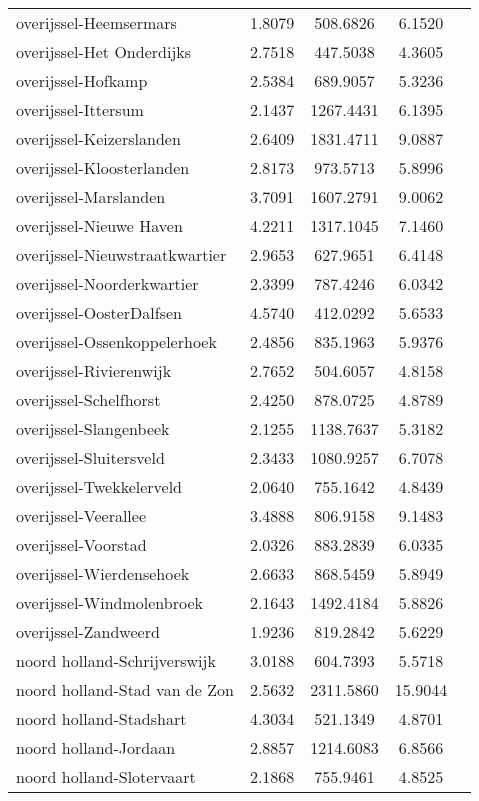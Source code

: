 \begin{longtable}{llccc}
overijssel-Heemsermars & 1.8079 & 508.6826 & 6.1520 \\
overijssel-Het Onderdijks & 2.7518 & 447.5038 & 4.3605 \\
overijssel-Hofkamp & 2.5384 & 689.9057 & 5.3236 \\
overijssel-Ittersum & 2.1437 & 1267.4431 & 6.1395 \\
overijssel-Keizerslanden & 2.6409 & 1831.4711 & 9.0887 \\
overijssel-Kloosterlanden & 2.8173 & 973.5713 & 5.8996 \\
overijssel-Marslanden & 3.7091 & 1607.2791 & 9.0062 \\
overijssel-Nieuwe Haven & 4.2211 & 1317.1045 & 7.1460 \\
overijssel-Nieuwstraatkwartier & 2.9653 & 627.9651 & 6.4148 \\
overijssel-Noorderkwartier & 2.3399 & 787.4246 & 6.0342 \\
overijssel-OosterDalfsen & 4.5740 & 412.0292 & 5.6533 \\
overijssel-Ossenkoppelerhoek & 2.4856 & 835.1963 & 5.9376 \\
overijssel-Rivierenwijk & 2.7652 & 504.6057 & 4.8158 \\
overijssel-Schelfhorst & 2.4250 & 878.0725 & 4.8789 \\
overijssel-Slangenbeek & 2.1255 & 1138.7637 & 5.3182 \\
overijssel-Sluitersveld & 2.3433 & 1080.9257 & 6.7078 \\
overijssel-Twekkelerveld & 2.0640 & 755.1642 & 4.8439 \\
overijssel-Veerallee & 3.4888 & 806.9158 & 9.1483 \\
overijssel-Voorstad & 2.0326 & 883.2839 & 6.0335 \\
overijssel-Wierdensehoek & 2.6633 & 868.5459 & 5.8949 \\
overijssel-Windmolenbroek & 2.1643 & 1492.4184 & 5.8826 \\
overijssel-Zandweerd & 1.9236 & 819.2842 & 5.6229 \\
noord holland-Schrijverswijk & 3.0188 & 604.7393 & 5.5718 \\
noord holland-Stad van de Zon & 2.5632 & 2311.5860 & 15.9044 \\
noord holland-Stadshart & 4.3034 & 521.1349 & 4.8701 \\
noord holland-Jordaan & 2.8857 & 1214.6083 & 6.8566 \\
noord holland-Slotervaart & 2.1868 & 755.9461 & 4.8525 \\

\end{longtable}
